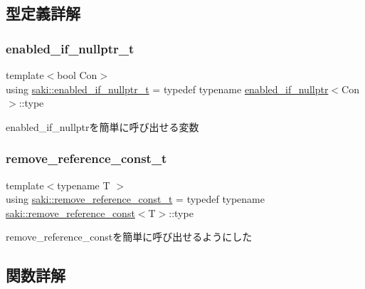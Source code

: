 \subsection{型定義詳解}
\mbox{\label{namespacesaki_aa1258d80ed2c906b1e48aee518368d43}} 
\subsubsection{\texorpdfstring{enabled\+\_\+if\+\_\+nullptr\+\_\+t}{enabled\_if\_nullptr\_t}}
{\footnotesize\ttfamily template$<$bool Con$>$ \\
using \mbox{\hyperlink{namespacesaki_aa1258d80ed2c906b1e48aee518368d43}{saki\+::enabled\+\_\+if\+\_\+nullptr\+\_\+t}} = typedef typename \mbox{\hyperlink{structsaki_1_1enabled__if__nullptr}{enabled\+\_\+if\+\_\+nullptr}}$<$Con$>$\+::type}



enabled\+\_\+if\+\_\+nullptrを簡単に呼び出せる変数 

\mbox{\label{namespacesaki_aff6964622fdfcdf489dab4b87727a8e4}} 
\subsubsection{\texorpdfstring{remove\+\_\+reference\+\_\+const\+\_\+t}{remove\_reference\_const\_t}}
{\footnotesize\ttfamily template$<$typename T $>$ \\
using \mbox{\hyperlink{namespacesaki_aff6964622fdfcdf489dab4b87727a8e4}{saki\+::remove\+\_\+reference\+\_\+const\+\_\+t}} = typedef typename \mbox{\hyperlink{structsaki_1_1remove__reference__const}{saki\+::remove\+\_\+reference\+\_\+const}}$<$T$>$\+::type}



remove\+\_\+reference\+\_\+constを簡単に呼び出せるようにした 



\subsection{関数詳解}
\mbox{\label{namespacesaki_a37cd607ad87b208aa6105b5d8287dc9e}} 
